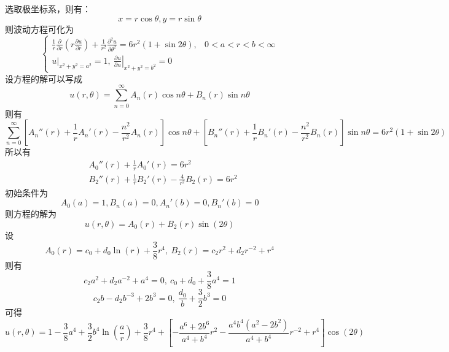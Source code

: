 \documentclass[10.5pt]{article}
\begin{document}
\section{}
选取极坐标系，则有：$$x=r\cos\theta,y=r\sin\theta$$\indent
则波动方程可化为$$\begin{cases}
    \frac{1}{r}\frac{\partial}{\partial r}\left(r\frac{\partial u}{\partial r}\right)+\frac{1}{r^2}\frac{\partial^2u}{\partial\theta^2}=6r^2(1+\sin2\theta),&0<a<r<b<\infty\\
    \left.u\right\rvert_{x^2+y^2=a^2}=1,~\left.\frac{\partial u}{\partial n}\right\rvert_{x^2+y^2=b^2}=0
\end{cases}$$\indent
设方程的解可以写成$$u(r,\theta)=\sum_{n=0}^{\infty}A_n(r)\cos n\theta+B_n(r)\sin n\theta$$\indent
则有$$\sum_{n=0}^{\infty}\left[A_{n}''(r)+\frac{1}{r}A_n'(r)-\frac{n^2}{r^2}A_n(r)\right]\cos n\theta+\left[B_{n}''(r)+\frac{1}{r}B_n'(r)-\frac{n^2}{r^2}B_n(r)\right]\sin n\theta=6r^2(1+\sin2\theta)$$\indent
所以有$$\begin{aligned}
    &A_0''(r)+\frac{1}{r}A_0'(r)=6r^2\\
    &B_2''(r)+\frac{1}{r}B_2'(r)-\frac{4}{r^2}B_2(r)=6r^2
\end{aligned}$$\indent
初始条件为$$A_0(a)=1,B_n(a)=0,A_n'(b)=0,B_n'(b)=0$$\indent
则方程的解为$$u(r,\theta)=A_0(r)+B_2(r)\sin(2\theta)$$\indent
设$$A_0(r)=c_0+d_0\ln(r)+\frac{3}{8}r^4,~B_2(r)=c_2r^2+d_2r^{-2}+r^4$$\indent
则有$$c_2a^2+d_2a^{-2}+a^4=0,~c_0+d_0+\frac{3}{8}a^4=1$$$$c_2b-d_2b^{-3}+2b^3=0,~\frac{d_0}{b}+\frac{3}{2}b^3=0$$\indent
可得$$u(r,\theta)=1-\frac{3}{8}a^4+\frac{3}{2}b^4\ln(\frac{a}{r})+\frac{3}{8}r^4+\left[-\frac{a^6+2b^6}{a^4+b^4}r^2-\frac{a^4b^4(a^2-2b^2)}{a^4+b^4}r^{-2}+r^4\right]\cos(2\theta)$$

\section{}
\subsection{}
\end{document}
